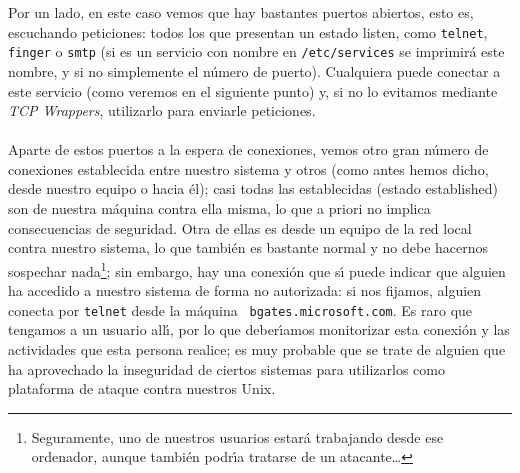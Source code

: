 \rm
Por un lado, en este caso vemos que hay bastantes puertos abiertos, esto es, 
escuchando
peticiones: todos los que presentan un estado {\sc listen}, como {\tt telnet},
{\tt finger} o {\tt smtp} (si es un servicio con nombre en {\tt /etc/services}
se imprimir\'a este nombre, y si no simplemente el n\'umero de puerto).
Cualquiera puede conectar a este servicio (como veremos en el siguiente punto)
y, si no lo evitamos mediante {\it TCP Wrappers}, utilizarlo para enviarle 
peticiones.\\
\\Aparte de estos puertos a la espera de conexiones, vemos otro gran n\'umero de
conexiones establecida entre nuestro sistema y otros (como antes hemos dicho,
desde nuestro equipo o hacia \'el); casi todas las establecidas (estado {\sc
established}) son de nuestra m\'aquina contra ella misma, lo que a priori no
implica consecuencias de seguridad. Otra de ellas es desde un equipo de la
red local contra nuestro sistema, lo que tambi\'en es bastante normal y no
debe hacernos sospechar nada\footnote{Seguramente, uno de nuestros usuarios
estar\'a trabajando desde ese ordenador, aunque tambi\'en podr\'{\i}a tratarse
de un atacante\ldots}; sin embargo, hay una conexi\'on que s\'{\i} puede 
indicar que alguien ha accedido a nuestro sistema de forma no autorizada: si
nos fijamos, alguien conecta por {\tt telnet} desde la m\'aquina {\tt 
bgates.microsoft.com}. Es raro que tengamos a un usuario all\'{\i}, por lo 
que deber\'{\i}amos monitorizar esta conexi\'on y las actividades que esta 
persona realice; es muy probable que se trate de alguien que ha aprovechado la
inseguridad de ciertos sistemas para utilizarlos como plataforma de ataque 
contra nuestros Unix.
